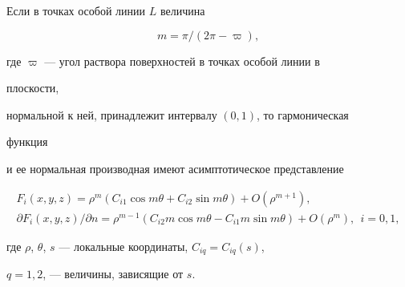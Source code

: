 \begin{lem} 


Если в точках особой линии $L$ величина 


\begin{equation} 


m=\pi/(2\pi-\varpi), 


\end{equation} 


где $\varpi$ --- угол раствора поверхностей в точках особой линии в 


плоскости, 


нормальной к ней, принадлежит интервалу $(0,1)$, то гармоническая 


функция 


и ее нормальная производная имеют асимптотическое представление 


\begin{equation} 


\begin{array}{c} 


F_i(x,y,z)=\rho^m(C_{i1}\cos m\theta+C_{i2}\sin m\theta)+ 


O(\rho^{m+1}),\\[2mm] 


\partial F_i(x,y,z)/\partial n=\rho^{m-1} 


(C_{i2}m\cos m\theta-C_{i1}m\sin m\theta) 


+O(\rho^m),\ \ i=0,1, 


\end{array} 


\end{equation} 


где $\rho$, $\theta$, $s$ --- локальные координаты, $C_{i q}=C_{i q}(s)$, 


$q=1,2$, --- величины, зависящие от $s$. 


\end{lem} 


 


